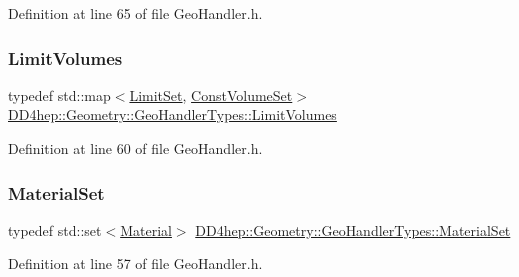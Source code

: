 Definition at line 65 of file Geo\+Handler.\+h.

\hypertarget{class_d_d4hep_1_1_geometry_1_1_geo_handler_types_ad8397c24589a1508baf0735bdb2b3c77}{}\label{class_d_d4hep_1_1_geometry_1_1_geo_handler_types_ad8397c24589a1508baf0735bdb2b3c77} 
\subsubsection{\texorpdfstring{Limit\+Volumes}{LimitVolumes}}
{\footnotesize\ttfamily typedef std\+::map$<$\hyperlink{class_d_d4hep_1_1_geometry_1_1_limit_set}{Limit\+Set}, \hyperlink{class_d_d4hep_1_1_geometry_1_1_geo_handler_types_ae294545274767eb8cf886a303033b351}{Const\+Volume\+Set}$>$ \hyperlink{class_d_d4hep_1_1_geometry_1_1_geo_handler_types_ad8397c24589a1508baf0735bdb2b3c77}{D\+D4hep\+::\+Geometry\+::\+Geo\+Handler\+Types\+::\+Limit\+Volumes}}



Definition at line 60 of file Geo\+Handler.\+h.

\hypertarget{class_d_d4hep_1_1_geometry_1_1_geo_handler_types_a2cb3f04bc3529531d1559173eea5f7b5}{}\label{class_d_d4hep_1_1_geometry_1_1_geo_handler_types_a2cb3f04bc3529531d1559173eea5f7b5} 
\subsubsection{\texorpdfstring{Material\+Set}{MaterialSet}}
{\footnotesize\ttfamily typedef std\+::set$<$\hyperlink{class_d_d4hep_1_1_geometry_1_1_material}{Material}$>$ \hyperlink{class_d_d4hep_1_1_geometry_1_1_geo_handler_types_a2cb3f04bc3529531d1559173eea5f7b5}{D\+D4hep\+::\+Geometry\+::\+Geo\+Handler\+Types\+::\+Material\+Set}}



Definition at line 57 of file Geo\+Handler.\+h.

\hypertarget{class_d_d4hep_1_1_geometry_1_1_geo_handler_types_a1e77c8aec4a291253804630c590af1d8}{}\label{class_d_d4hep_1_1_geometry_1_1_geo_handler_types_a1e77c8aec4a291253804630c590af1d8} 
